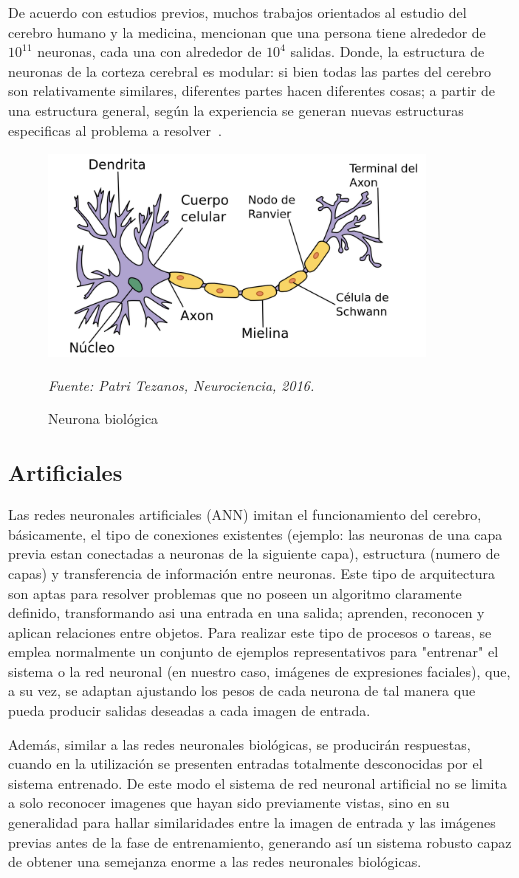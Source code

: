 De acuerdo con estudios previos, muchos trabajos orientados al estudio del cerebro humano y la medicina, mencionan que una persona tiene alrededor de $10^{11}$ neuronas, cada una con alrededor de $10^4$ salidas. Donde, la estructura de neuronas de la corteza cerebral es modular: si bien todas las partes del cerebro son relativamente similares, diferentes partes hacen diferentes cosas; a partir de una estructura general, según la experiencia se generan nuevas estructuras especificas al problema a resolver~\cite{16pusiol2014redes}. 


\begin{figure}[H]
		\centering
		\includegraphics[width=100mm]{Imagenes/neurona_biologica.png}
		\caption{Neurona biológica}
		\vspace{0.15cm}
		\textit{Fuente: Patri Tezanos, Neurociencia, 2016.}
		\label{fig:neurona_biologica}
\end{figure} 


\subsection{Artificiales}
Las redes neuronales artificiales (ANN) imitan el funcionamiento del cerebro, básicamente,  el tipo de  conexiones existentes (ejemplo: las neuronas de una capa previa estan conectadas a neuronas de la siguiente capa), estructura (numero de capas) y transferencia de información entre neuronas. Este tipo de arquitectura son aptas para resolver problemas que no poseen un algoritmo claramente definido, transformando asi una entrada en una salida; aprenden, reconocen y aplican relaciones entre objetos. Para realizar este tipo de procesos o tareas, se emplea normalmente un conjunto de ejemplos representativos para "entrenar" el sistema o la red neuronal (en nuestro caso, imágenes de expresiones faciales), que, a su vez, se adaptan ajustando los pesos de cada neurona de tal manera que pueda producir salidas deseadas a cada imagen de entrada.

Además, similar a las redes neuronales biológicas, se producirán respuestas, cuando en la utilización se presenten entradas totalmente desconocidas por el sistema entrenado. De este modo el sistema de red neuronal artificial no se limita a solo reconocer imagenes que hayan sido previamente vistas, sino en su generalidad para hallar similaridades entre la imagen de entrada y las imágenes previas antes de la fase de entrenamiento, generando así un sistema robusto capaz de obtener una semejanza enorme a las redes neuronales biológicas.

